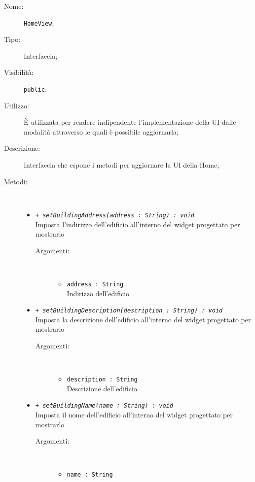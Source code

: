 \documentclass[../DefinizioneDiProdotto.tex]{subfiles}
\begin{document}
\begin{description}
	\item[Nome:] \texttt{HomeView};
	\item[Tipo:] Interfaccia;
	\item[Visibilità:] \texttt{public};
	\item[Utilizzo:] È utilizzata per rendere indipendente l'implementazione della UI dalle modalità attraverso le quali è possibile aggiornarla;
	\item[Descrizione:] Interfaccia che espone i metodi per aggiornare la UI della Home;
	\item[Metodi:] \
	\begin{itemize}
		\item \texttt{+ \textit{setBuildingAddress(address : String) : void}}\\
		Imposta l'indirizzo dell'edificio all'interno del widget progettato per mostrarlo
		\begin{description}
			\item[Argomenti:] \
			\begin{itemize}
				\item \texttt{address : String}\\
				Indirizzo dell'edificio\end{itemize}
		\end{description}
		\item \texttt{+ \textit{setBuildingDescription(description : String) : void}}\\
		Imposta la descrizione dell'edificio all'interno del widget progettato per mostrarlo
		\begin{description}
			\item[Argomenti:] \
			\begin{itemize}
				\item \texttt{description : String}\\
				Descrizione dell'edificio\end{itemize}
		\end{description}
		\item \texttt{+ \textit{setBuildingName(name : String) : void}}\\
		Imposta il nome dell'edificio all'interno del widget progettato per mostrarlo
		\begin{description}
			\item[Argomenti:] \
			\begin{itemize}
				\item \texttt{name : String}\\

\end{itemize}
\end{description}
\end{itemize}
\end{description}
\end{document}
